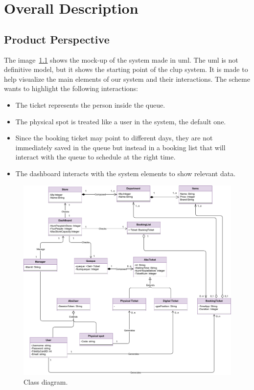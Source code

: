 \chapter{Overall Description}

\section{Product Perspective}
The image~\ref{figure:UML} shows the mock-up of the system made in \gls{uml}. The \gls{uml} is not definitive model, but it shows the starting point of the \gls{clup} system. It is made to help visualize the main elements of our system and their interactions. The scheme wants to highlight the following interactions:
\begin{itemize}

	\item The ticket represents the person inside the queue.

	\item The physical spot is treated like a user in the system, the default one. 

	\item Since the booking ticket may point to different days, they are not immediately saved in the queue but instead in a booking list that will interact with the 	queue to schedule at the right time.

	\item The dashboard interacts with the system elements to show relevant data. 
\end{itemize}

\begin{figure}[H]
	\centering
	\includegraphics[width=1.0\textwidth]{images/UML.pdf}
	\caption{Class diagram.}
	\label{figure:UML}
\end{figure}

